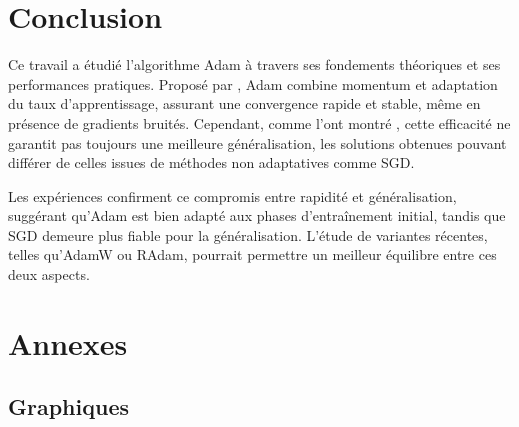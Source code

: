 \documentclass[a4paper,12pt]{article}
\begin{document}
\section{Conclusion}

Ce travail a étudié l’algorithme Adam à travers ses fondements
théoriques et ses performances pratiques. Proposé par
\cite{kingma2014}, Adam combine momentum et adaptation du taux
d’apprentissage, assurant une convergence rapide et stable, même en
présence de gradients bruités. Cependant, comme l’ont montré
\cite{wilson2017}, cette efficacité ne garantit pas toujours une
meilleure généralisation, les solutions obtenues pouvant différer de
celles issues de méthodes non adaptatives comme SGD.

Les expériences confirment ce compromis entre rapidité et
généralisation, suggérant qu’Adam est bien adapté aux phases
d’entraînement initial, tandis que SGD demeure plus fiable pour la
généralisation. L’étude de variantes récentes, telles qu’AdamW ou
RAdam, pourrait permettre un meilleur équilibre entre ces deux aspects.


\newpage

\appendix
\section{Annexes}
\label{annexes}

\subsection{Graphiques}
\end{document}
